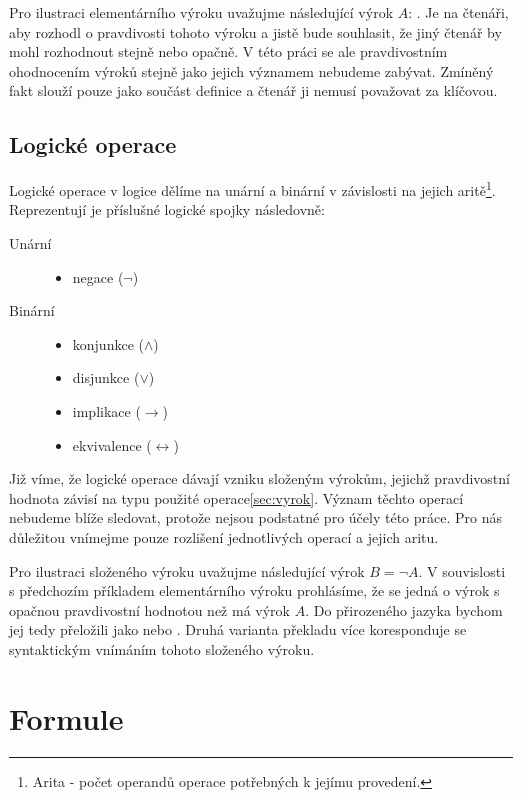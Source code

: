 \documentclass[thesis=B,czech]{FITthesis}[2012/06/26]
\begin{document}
Pro ilustraci elementárního výroku uvažujme následující výrok $A$: . Je na čtenáři, aby rozhodl o pravdivosti tohoto výroku a jistě bude souhlasit, že jiný čtenář by mohl rozhodnout stejně nebo opačně. V této práci se ale pravdivostním ohodnocením výroků stejně jako jejich významem nebudeme zabývat. Zmíněný fakt slouží pouze jako součást definice a čtenář ji nemusí považovat za klíčovou.

\subsection{Logické operace}
Logické operace v logice dělíme na unární a binární v závislosti na jejich aritě\footnote{Arita - počet operandů operace potřebných k jejímu provedení.}. Reprezentují je příslušné logické spojky následovně:
\begin{description}
\item[Unární]
	\begin{itemize}
	\item negace ($\neg$)
	\end{itemize}
\item[Binární]
	\begin{itemize}
	\item konjunkce ($\wedge$)
	\item disjunkce ($\vee$)
	\item implikace ($\rightarrow$)
	\item ekvivalence ($\leftrightarrow$)
	\end{itemize}
\end{description}
Již víme, že logické operace dávají vzniku složeným výrokům, jejichž pravdivostní hodnota závisí na typu použité operace\ref{sec:vyrok}. Význam těchto operací nebudeme blíže sledovat, protože nejsou podstatné pro účely této práce. Pro nás důležitou vnímejme pouze rozlišení jednotlivých operací a jejich aritu.

Pro ilustraci složeného výroku uvažujme následující výrok $B = \neg A$. V souvislosti s předchozím příkladem elementárního výroku prohlásíme, že se jedná o výrok s opačnou pravdivostní hodnotou než má výrok $A$. Do přirozeného jazyka bychom jej tedy přeložili jako  nebo . Druhá varianta překladu více koresponduje se syntaktickým vnímáním tohoto složeného výroku.

\section{Formule}
\end{document}
